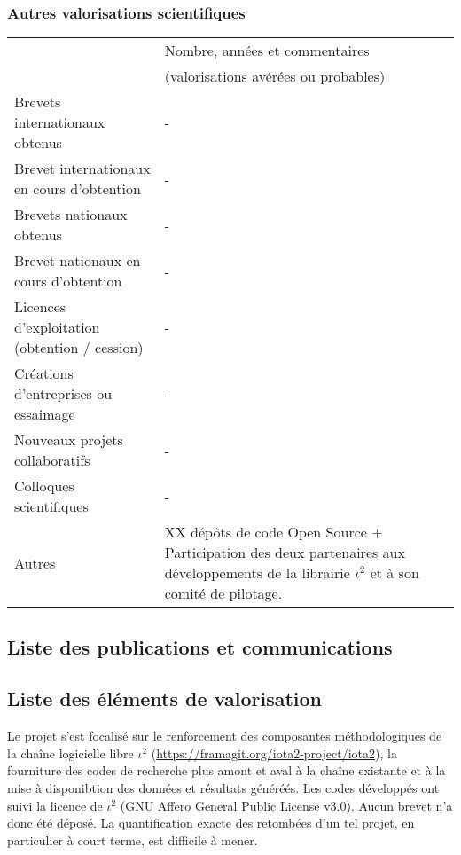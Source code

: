 \subsubsection*{Autres valorisations scientifiques} 
\begin{table}[htbp]
\small
    \centering
    \begin{tabular}{|p{5.5cm}|p{6cm}|}
    \hline
& Nombre, années et commentaires \\
&(valorisations avérées ou probables)\\\hline
Brevets internationaux obtenus&-\\\hline
Brevet internationaux en cours d’obtention&- \\\hline
Brevets nationaux obtenus&- \\\hline
Brevet nationaux en cours d’obtention&- \\\hline
Licences d’exploitation (obtention / cession)&- \\\hline
Créations d’entreprises ou essaimage&- \\\hline
Nouveaux projets collaboratifs & - \\\hline
Colloques scientifiques&- \\\hline
Autres & XX dépôts de code Open Source + Participation des deux partenaires aux développements de la librairie $\iota^2$ et à son \href{https://framagit.org/iota2-project/iota2/-/wikis/Project-Steering-Committee}{comité de pilotage}. \\
\hline
    \end{tabular}
    \label{tab:valo_other}
\end{table}


\subsection{Liste des publications et communications}

\printbibliography[keyword={LASTIG-CESBIO-j},title={Journaux}]
\printbibliography[keyword={LASTIG-CESBIO-c},title={Conférences}]
\printbibliography[keyword={LASTIG-CESBIO-a},title={Autres communications}]

\subsection{Liste des éléments de valorisation}
\label{subsec:valo}
Le projet s'est focalisé sur le renforcement des composantes méthodologiques de la chaîne logicielle libre $\iota^2$ (\href{https://framagit.org/iota2-project/iota2}{https://framagit.org/iota2-project/iota2}), la fourniture des codes de recherche plus amont et aval à la chaîne existante et à la mise à disponibtion des données et résultats généréés. Les codes développés ont suivi la licence de $\iota^2$ (GNU Affero General Public License v3.0). Aucun brevet n'a donc été déposé. La quantification exacte des retombées d'un tel projet, en particulier à court terme, est difficile à mener.

